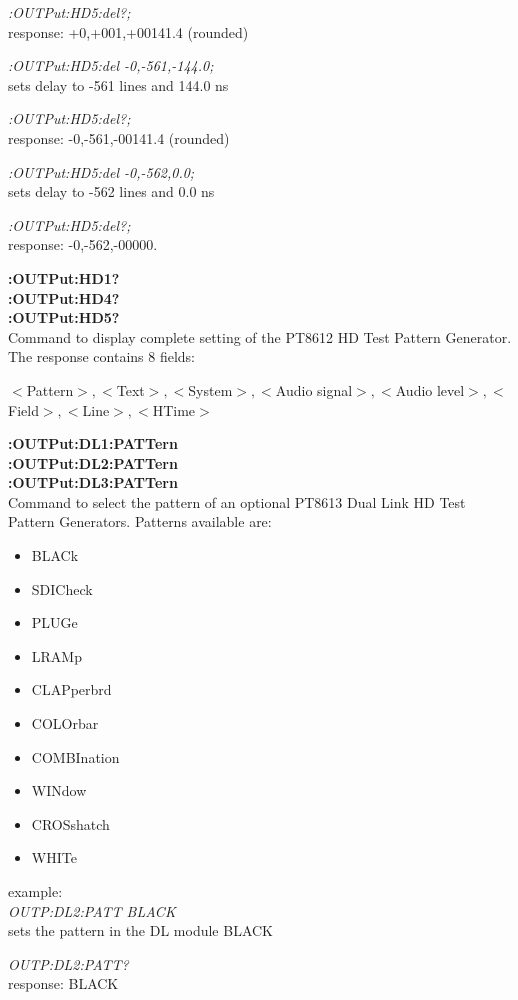 \textit{:OUTPut:HD5:del?;}\\ 
response: +0,+001,+00141.4 (rounded)

\textit{:OUTPut:HD5:del -0,-561,-144.0;}\\
sets delay to -561 lines and 144.0 ns

\textit{:OUTPut:HD5:del?;}\\
response: -0,-561,-00141.4 (rounded)

\textit{:OUTPut:HD5:del -0,-562,0.0;}\\
sets delay to -562 lines and 0.0 ns

\textit{:OUTPut:HD5:del?;}\\
response: -0,-562,-00000.

\textbf{:OUTPut:HD1?}\\
\textbf{:OUTPut:HD4?}\\
\textbf{:OUTPut:HD5?}\\
Command to display complete setting of the PT8612 HD Test Pattern Generator.  The response contains 8 fields:

$<$Pattern$>,<$Text$>,<$System$>,<$Audio signal$>,<$Audio level$>,<$Field$>,<$Line$>,<$HTime$>$

\textbf{:OUTPut:DL1:PATTern}\\
\textbf{:OUTPut:DL2:PATTern}\\
\textbf{:OUTPut:DL3:PATTern}\\
Command to select the pattern of an optional PT8613 Dual Link HD Test Pattern Generators. Patterns available are:
  
\begin{itemize}
\item BLACk
\item SDICheck
\item PLUGe
\item LRAMp
\item CLAPperbrd
\item COLOrbar
\item COMBInation
\item WINdow
\item CROSshatch
\item WHITe
\end{itemize}

example:\\
\textit{OUTP:DL2:PATT BLACK}\\
sets the pattern in the DL module BLACK

\textit{OUTP:DL2:PATT?}\\
response: BLACK

